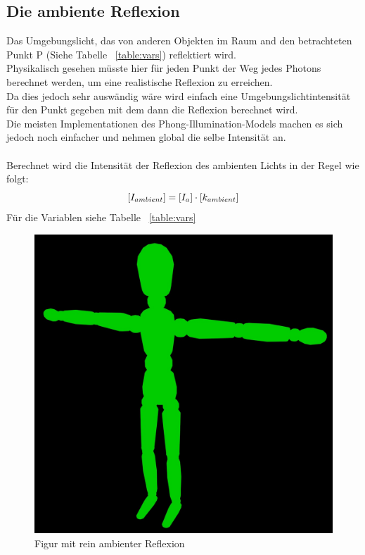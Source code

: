 \documentclass[a4paper]{scrartcl}%
\begin{document}
    \subsection{Die ambiente Reflexion}%
    \label{sub:die_ambiente_reflexion}
        Das Umgebungslicht, das von anderen Objekten im Raum and den betrachteten Punkt P (Siehe Tabelle ~\ref{table:vars}) reflektiert wird.\\
        Physikalisch gesehen müsste hier für jeden Punkt der Weg jedes Photons berechnet werden, um eine realistische Reflexion zu erreichen.\\
        Da dies jedoch sehr auswändig wäre wird einfach eine Umgebungslichtintensität für den Punkt gegeben mit dem dann die Reflexion berechnet wird.\\
        Die meisten Implementationen des Phong-Illumination-Models machen es sich jedoch noch einfacher und nehmen global die selbe Intensität an.\\
        \\Berechnet wird die Intensität der Reflexion des ambienten Lichts in der Regel wie folgt:\\
        \begin{equation}
            \label{eq:amb}
                [I_{ambient}] = [I_a] \cdot [k_{ambient}]\\
        \end{equation}
        Für die Variablen siehe Tabelle ~\ref{table:vars}\\

        \begin{figure}[H]
            \centering
            \includegraphics[scale=0.2]{./possible-images/light-types/ambient.jpg}
            \caption{Figur mit rein ambienter Reflexion}
            \label{fig:./possible-images/light-types/ambient}
        \end{figure}%
\end{document}
